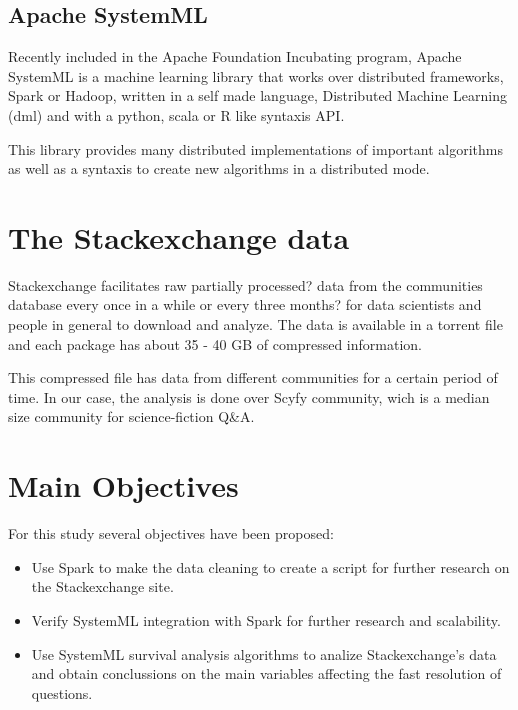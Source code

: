 \documentclass[11pt]{article} %
\begin{document}
\subsection{Apache SystemML}

Recently included in the Apache Foundation Incubating  program, Apache SystemML is a machine learning library that works over distributed frameworks, Spark or Hadoop, written in a self made language, Distributed Machine Learning (dml) and with a python, scala or R like syntaxis API.

This library provides many distributed implementations of important algorithms as well as a syntaxis to create new algorithms in a distributed mode.

\section{The Stackexchange data}

Stackexchange facilitates raw {partially processed?} data from the communities database every once in a while {or every three months?} for data scientists and people in general to download and analyze. The data is available in a torrent file and each package has about 35 - 40 GB of compressed information.

This compressed file has data from different communities for a certain period of time. In our case, the analysis is done over Scyfy community, wich is a median size community for science-fiction Q\&A.

\section{Main Objectives}

For this study several objectives have been proposed:

\begin{itemize}

  \item Use Spark to make the data cleaning to create a script for further research on the Stackexchange site.

  \item Verify SystemML integration with Spark for further research and scalability.

  \item Use SystemML survival analysis algorithms to analize Stackexchange's data and obtain conclussions on the main variables affecting the fast resolution of questions.

\end{itemize}
\end{document}
